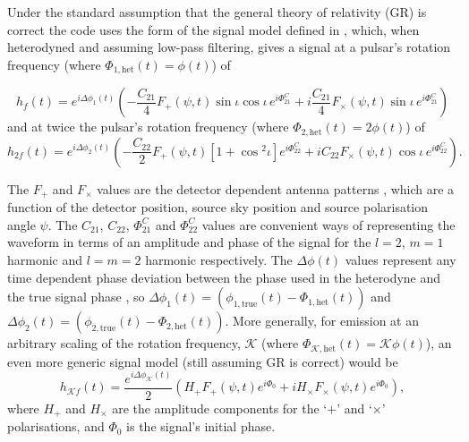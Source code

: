 Under the standard assumption that the general theory of relativity (GR) is correct the code uses the form of
the signal model defined in \citet{2015arXiv150105832J}, which, when heterodyned and assuming low-pass
filtering, gives a signal at a pulsar's rotation frequency (where $\Phi_{1,{\text{het}}}(t) = \phi(t)$) of
\begin{widetext}
\begin{equation}\label{eq:hf}
h_f(t) =  e^{i\Delta\phi_1(t)}\left(-\frac{C_{21}}{4}F_{+}(\psi,t)\sin{\iota}\cos{\iota}\,e^{i\Phi_{21}^C} +
i\frac{C_{21}}{4}F_{\times}(\psi,t)\sin{\iota}\,e^{i\Phi_{21}^C} \right)
\end{equation}
and at twice the pulsar's rotation frequency (where $\Phi_{2,{\text{het}}}(t) = 2\phi(t)$) of
\begin{equation}\label{eq:h2f}
h_{2f}(t) =  e^{i\Delta\phi_2(t)}\left(-\frac{C_{22}}{2}F_{+}(\psi,t)[1+\cos{}^2\iota]e^{i\Phi_{22}^C} +
iC_{22}F_{\times}(\psi,t)\cos{\iota}\,e^{i\Phi_{22}^C} \right).
\end{equation}
\end{widetext}
The $F_{+}$ and $F_{\times}$ values are the detector dependent antenna patterns \citep[see, e.g., equation~\ref{eq:antenna}, taken from][]{1998PhRvD..58f3001J},
which are a function of the
detector position, source sky position and source polarisation angle $\psi$. The $C_{21}$, $C_{22}$,
$\Phi_{21}^C$ and $\Phi_{22}^C$ values are convenient ways of representing the waveform in terms of an
amplitude and phase of the signal for the $l=2$, $m=1$ harmonic and $l=m=2$ harmonic respectively. The
$\Delta\phi(t)$ values represent any time dependent phase deviation between the phase used in the heterodyne
and the true signal phase \citep[which does not necessarily have to precisely follow the electromagnetically observed rotational phase, see discussions in, e.g.,][]{2008ApJ...683L..45A}, so
$\Delta\phi_1(t) = (\phi_{1,{\text{true}}}(t)-\Phi_{1,{\text{het}}}(t))$ and $\Delta\phi_2(t) = (\phi_{2,{\text{true}}}(t)-\Phi_{2,{\text{het}}}(t))$. More generally,
for emission at an arbitrary scaling of the rotation frequency, $\mathcal{K}$ (where $\Phi_{\mathcal{K},{\text{het}}}(t) = \mathcal{K}\phi(t)$), an even more generic signal model (still assuming GR is correct) would be
\begin{equation}\label{eq:hkf}
h_{\mathcal{K}f}(t) =  \frac{e^{i\Delta\phi_{\mathcal{K}}(t)}}{2}\left(H_+F_{+}(\psi,t)e^{i\Phi_0} +
iH_{\times}F_{\times}(\psi,t)e^{i\Phi_{0}} \right),
\end{equation}
where $H_+$ and $H_{\times}$ are the amplitude components for the `$+$' and `$\times$' polarisations, and $\Phi_0$ is the signal's initial phase.

